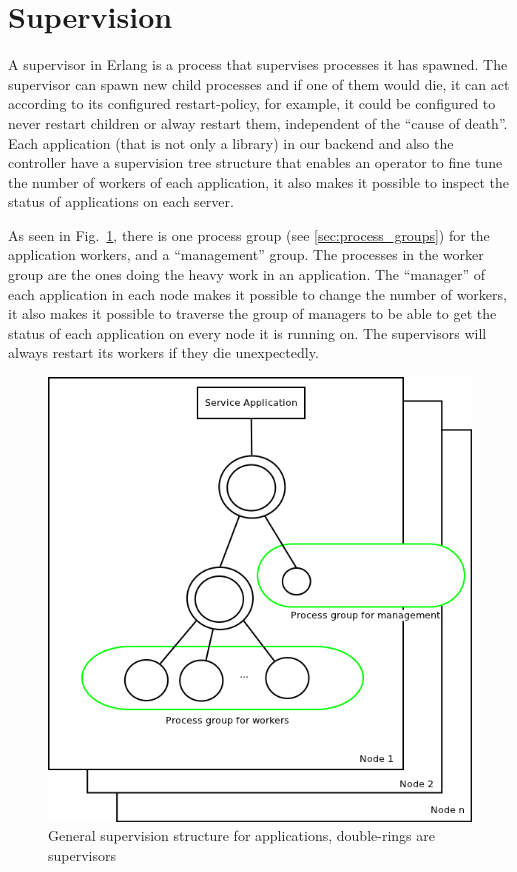 \documentclass[11pt,a4paper]{report}
\begin{document}
\newpage
\section{Supervision}
A supervisor in Erlang is a process that supervises processes it has spawned.
The supervisor can spawn new child processes and if one of them would die, it
can act according to its configured restart-policy, for example, it could be
configured to never restart children or alway restart them, independent of the
``cause of death''.\\

Each application (that is not only a library) in our backend and also the
controller have a supervision tree structure that enables an operator to fine
tune the number of workers of each application, it also makes it possible
to inspect the status of applications on each server.

As seen in Fig.~\ref{fig:service_app}, there is one process group
(see \ref{sec:process_groups}) for the application workers, and a ``management''
group. The processes in the worker group are the ones doing the heavy work in an
application. The ``manager'' of each application in each node makes it
possible to change the number of workers, it also makes it possible to traverse
the group of managers to be able to get the status of each application on every
node it is running on. The supervisors will always restart its workers if they
die unexpectedly.
\begin{figure}[h]
 \centering
 \includegraphics[width=\textwidth]{./graphics/Service_Application.png}
 \caption{General supervision structure for applications, double-rings are
supervisors}
 \label{fig:service_app}
\end{figure}
\end{document}
